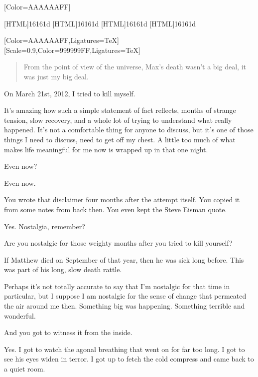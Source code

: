 \label{selfharm:suicide}
\renewfontfamily{}[Color=AAAAAAFF]

[HTML]{16161d}
[HTML]{16161d}
[HTML]{16161d}
[HTML]{16161d}
\begin{paracol}{2}
\begin{leftcolumn}

[Color=AAAAAAFF,Ligatures=TeX]
\renewfontfamily{}[Scale=0.9,Color=999999FF,Ligatures=TeX]

\begin{quotation}
  \noindent From the point of view of the universe, Max's death wasn't a big deal, it was just my big deal.
\end{quotation}

\noindent On March 21st, 2012, I tried to kill myself.

It's amazing how such a simple statement of fact reflects, months of strange tension, slow recovery, and a whole lot of trying to understand what really happened. It's not a comfortable thing for anyone to discuss, but it's one of those things I need to discuss, need to get off my chest. A little too much of what makes life meaningful for me now is wrapped up in that one night.

\begin{ally}
Even now?
\end{ally}
Even now.

\begin{ally}
You wrote that disclaimer four months after the attempt itself. You copied it from some notes from back then. You even kept the Steve Eisman quote.
\end{ally}
Yes. Nostalgia, remember?

\begin{ally}
Are you nostalgic for those weighty months after you tried to kill yourself?
\end{ally}
If Matthew died on September of that year, then he was sick long before. This was part of his long, slow death rattle.

Perhaps it's not totally accurate to say that I'm nostalgic for that time in particular, but I suppose I am nostalgic for the sense of change that permeated the air around me then. Something big was happening. Something terrible and wonderful.

\begin{ally}
And you got to witness it from the inside.
\end{ally}
Yes. I got to watch the agonal breathing that went on for far too long. I got to see his eyes widen in terror. I got up to fetch the cold compress and came back to a quiet room.


\end{leftcolumn}
\end{paracol}
